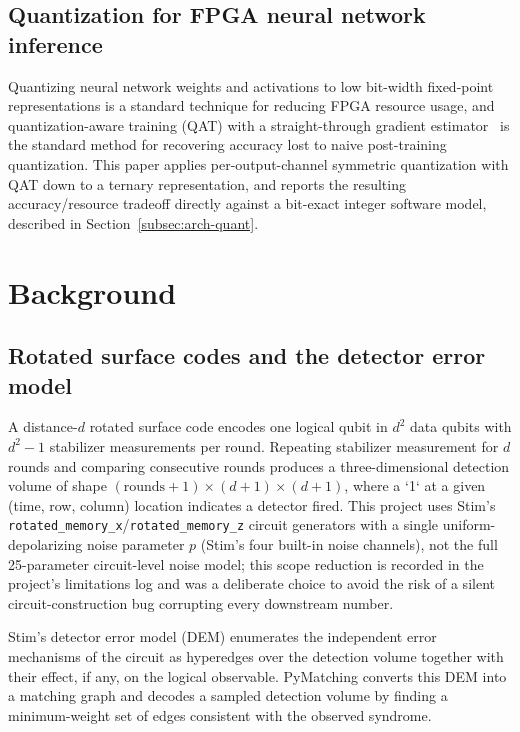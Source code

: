 \documentclass[conference]{IEEEtran}
\begin{document}
\subsection{Quantization for FPGA neural network inference}
Quantizing neural network weights and activations to low bit-width fixed-point representations is a standard technique for reducing FPGA resource usage, and quantization-aware training (QAT) with a straight-through gradient estimator~\cite{bengio2013ste} is the standard method for recovering accuracy lost to naive post-training quantization. This paper applies per-output-channel symmetric quantization with QAT down to a ternary representation, and reports the resulting accuracy/resource tradeoff directly against a bit-exact integer software model, described in Section~\ref{subsec:arch-quant}.

\section{Background}
\label{sec:background}

\subsection{Rotated surface codes and the detector error model}
A distance-\(d\) rotated surface code encodes one logical qubit in \(d^2\) data qubits with \(d^2-1\) stabilizer measurements per round. Repeating stabilizer measurement for \(d\) rounds and comparing consecutive rounds produces a three-dimensional detection volume of shape \((\text{rounds}+1) \times (d+1) \times (d+1)\), where a `1` at a given (time, row, column) location indicates a detector fired. This project uses Stim's \texttt{rotated\_memory\_x}/\texttt{rotated\_memory\_z} circuit generators with a single uniform-depolarizing noise parameter \(p\) (Stim's four built-in noise channels), not the full 25-parameter circuit-level noise model; this scope reduction is recorded in the project's limitations log and was a deliberate choice to avoid the risk of a silent circuit-construction bug corrupting every downstream number.

Stim's detector error model (DEM) enumerates the independent error mechanisms of the circuit as hyperedges over the detection volume together with their effect, if any, on the logical observable. PyMatching converts this DEM into a matching graph and decodes a sampled detection volume by finding a minimum-weight set of edges consistent with the observed syndrome.
\end{document}
